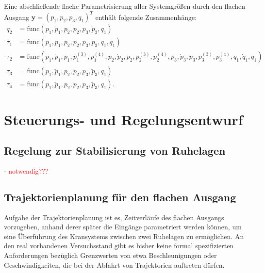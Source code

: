 Eine abschließende flache Parametrisierung aller Systemgrößen durch den flachen Ausgang $\mathbf{y} = (p_1, p_2, p_3, q_1)^T$ enthält folgende Zusammenhänge:
\begin{subequations}
	\begin{align}
		q_2 &= \mathrm{func}(p_1, \ddot{p}_1, p_2, \ddot{p}_2, p_3, \ddot{p}_3, q_1) \\
		\tau_1 &= \mathrm{func}(p_1, \ddot{p}_1, p_2, \ddot{p}_2, p_3, \ddot{p}_3, q_1, \ddot{q}_1) \\
		\tau_2 &= \mathrm{func}(p_1, \dot{p}_1, \ddot{p}_1, p_1^{(3)}, p_1^{(4)}, p_2, \dot{p}_2, \ddot{p}_2, p_2^{(3)}, p_2^{(4)}, p_3, \dot{p}_3, \ddot{p}_3, p_3^{(3)}, p_3^{(4)}, q_1, \dot{q}_1, \ddot{q}_1) \\
		\tau_3 &= \mathrm{func}(p_1, \ddot{p}_1, p_2, \ddot{p}_2, p_3, \ddot{p}_3, q_1) \\
		\tau_4 &= \mathrm{func}(p_1, \ddot{p}_1, p_2, \ddot{p}_2, p_3, \ddot{p}_3, q_1).
	\end{align}
\end{subequations}

\chapter{Steuerungs- und Regelungsentwurf}

\section{Regelung zur Stabilisierung von Ruhelagen}
- \textcolor{red}{notwendig???}

\section{Trajektorienplanung für den flachen Ausgang}
\label{sec:trajectory_flat_output}
Aufgabe der Trajektorienplanung ist es, Zeitverläufe des flachen Ausgangs vorzugeben, anhand derer später die Eingänge parametriert werden können, um eine Überführung des Kransystems zwischen zwei Ruhelagen zu ermöglichen. An den real vorhandenen Versuchsstand gibt es bisher keine formal spezifizierten Anforderungen bezüglich Grenzwerten von etwa Beschleunigungen oder Geschwindigkeiten, die bei der Abfahrt von Trajektorien auftreten dürfen.

